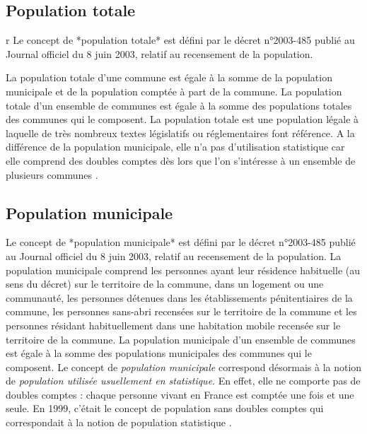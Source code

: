 \documentclass[12pt,english,french,twoside]{report}\usepackage[]{graphicx}\usepackage[]{color}
\begin{document}
\subsection*{Population totale}
r
Le concept de *population totale* est défini par le décret n°2003-485 publié au Journal officiel du 8 juin 2003, relatif au recensement de la population.

La population totale d'une commune est égale à la somme de la population municipale et de la population comptée à part de la commune.
La population totale d'un ensemble de communes est égale à la somme des populations totales des communes qui le composent.
La population totale est une population légale à laquelle de très nombreux textes législatifs ou réglementaires font référence. A la différence de la population municipale, elle n'a pas d'utilisation statistique car elle comprend des doubles comptes dès lors que l'on s'intéresse à un ensemble de plusieurs communes \cite{7}.

\subsection*{Population municipale}
Le concept de *population municipale* est défini par le décret n°2003-485 publié au Journal officiel du 8 juin 2003, relatif au recensement de la population.
La population municipale comprend les personnes ayant leur résidence habituelle (au sens du décret) sur le territoire de la commune, dans un logement ou une communauté, les personnes détenues dans les établissements pénitentiaires de la commune, les personnes sans-abri recensées sur le territoire de la commune et les personnes résidant habituellement dans une habitation mobile recensée sur le territoire de la commune.
La population municipale d'un ensemble de communes est égale à la somme des populations municipales des communes qui le composent.
Le concept de \emph{population municipale} correspond désormais à la notion de \emph{population utilisée usuellement en statistique}. En effet, elle ne comporte pas de doubles comptes : chaque personne vivant en France est comptée une fois et une seule. En 1999, c'était le concept de population sans doubles comptes qui correspondait à la notion de population statistique \cite{6}.
\end{document}
